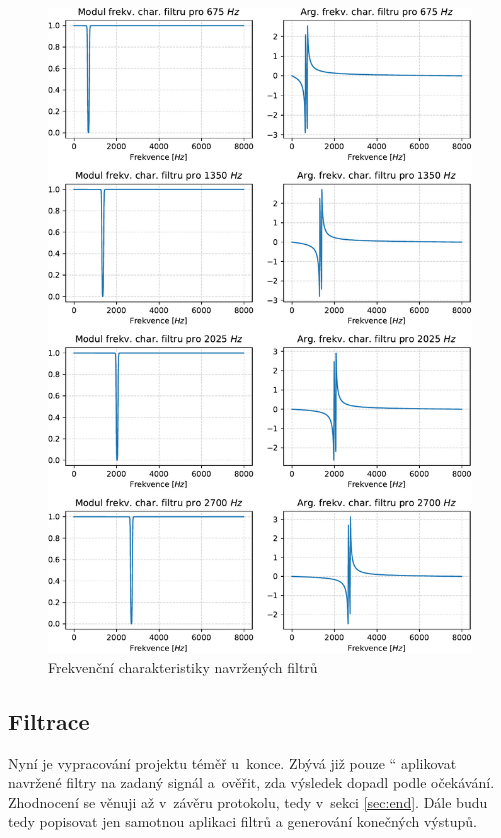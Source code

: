 \documentclass[a4paper, 11pt, final]{article}
\providecommand{\uv}[1]{\quotedblbase #1 \textquotedblleft}
\begin{document}
\begin{figure}[hp]
    \centering
    \includegraphics[scale=0.75]{img/09-freq-character.pdf}
    \caption{Frekvenční charakteristiky navržených filtrů}
    \label{fig:filters-freq-character}
\end{figure}



\subsection{Filtrace}
\label{sec:filtration}
Nyní je vypracování projektu téměř u~konce. Zbývá již \uv{pouze} aplikovat navržené filtry na zadaný signál a~ověřit, zda výsledek dopadl podle očekávání. Zhodnocení se věnuji až v~závěru protokolu, tedy v~sekci \ref{sec:end}. Dále budu tedy popisovat jen samotnou aplikaci filtrů a generování konečných výstupů.
\end{document}
